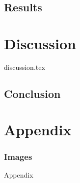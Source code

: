 \documentclass[printGloss]{myRUCProject}
\begin{document}

\newpage
\chapter{Results}


\newpage
\part{Discussion}
{discussion.tex}

\newpage
\chapter{Conclusion}


\appendix
\part*{Appendix}

\section{Images}\label{ap:sfd}
{Appendix}
\end{document}
